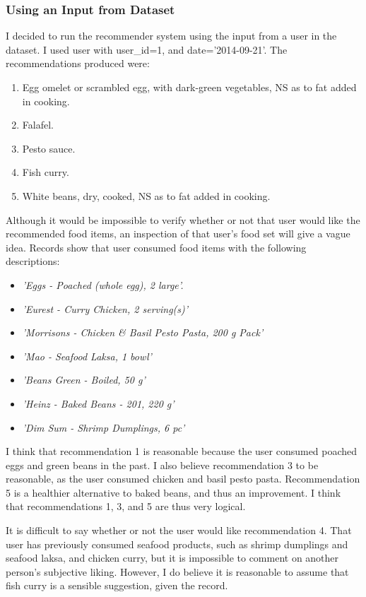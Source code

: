 \documentclass{article}
\begin{document}
\subsubsection{Using an Input from Dataset}
I decided to run the recommender system using the input from a user in the dataset. I used user with user\_id=1, and date='2014-09-21'. The recommendations produced were: 

\begin{enumerate}
    \item Egg omelet or scrambled egg, with dark-green vegetables, NS as to fat added in cooking.
    \item Falafel.
    \item Pesto sauce.
    \item Fish curry.
    \item White beans, dry, cooked, NS as to fat added in cooking.
\end{enumerate}

\bigskip
\noindent Although it would be impossible to verify whether or not that user would like the recommended food items, an inspection of that user's food set will give a vague idea. Records show that user consumed food items with the following descriptions:

\begin{itemize}
    \item \textit{'Eggs - Poached (whole egg), 2 large'.}
    \item \textit{'Eurest - Curry Chicken, 2 serving(s)'}
    \item \textit{'Morrisons - Chicken & Basil Pesto Pasta, 200 g Pack'}
    \item \textit{'Mao - Seafood Laksa, 1 bowl'}
    \item \textit{'Beans Green - Boiled, 50 g'}
    \item \textit{'Heinz - Baked Beans - 201, 220 g'}
    \item \textit{'Dim Sum - Shrimp Dumplings, 6 pc'}
\end{itemize}

\bigskip
\noindent I think that recommendation 1 is reasonable because the user consumed poached eggs and green beans in the past. I also believe recommendation 3 to be reasonable, as the user consumed chicken and basil pesto pasta. Recommendation 5 is a healthier alternative to baked beans, and thus an improvement. I think that recommendations 1, 3, and 5 are thus very logical.

\bigskip
\noindent It is difficult to say whether or not the user would like recommendation 4. That user has previously consumed seafood products, such as shrimp dumplings and seafood laksa, and chicken curry, but it is impossible to comment on another person's subjective liking. However, I do believe it is reasonable to assume that fish curry is a sensible suggestion, given the record.
\end{document}
